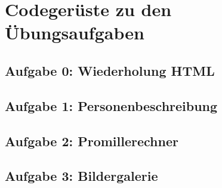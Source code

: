 \begin{appendices}

\label{pdf:AB_Variablen_if}
\pagebreak

\section{Codegerüste zu den Übungsaufgaben}
\label{app:codegerüste}

\subsection{Aufgabe 0: Wiederholung HTML}
\label{app:code0}




\subsection{Aufgabe 1: Personenbeschreibung}
\label{app:code1}






\subsection{Aufgabe 2: Promillerechner}
\label{app:code2}






\subsection{Aufgabe 3: Bildergalerie}
\label{app:code3}




\end{appendices}
